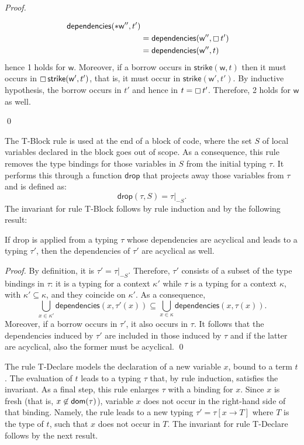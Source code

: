 \begin{proof}
\begin{itemize}
\begin{align*}
      \mathsf{dependencies}(\mathtt{*}\mathsf{w}'',t')\\
      &=\mathsf{dependencies}(\mathsf{w}'',\boxempty\,{t'})\\
      &=\mathsf{dependencies}(\mathsf{w}'',t)
    \end{align*}
    hence 1 holds for $\mathsf{w}$. Moreover, if a borrow occurs in
    $\mathsf{strike}(\mathsf{w},t)$ then it must occurs
    in $\boxempty\,{\mathsf{strike}(\mathsf{w}',t')}$, that is, it must occur in
    $\mathsf{strike}(\mathsf{w}',t')$. By inductive hypothesis, the borrow
    occurs in $t'$ and hence in $t=\boxempty\,{t'}$. Therefore, 2 holds for
    $\mathsf{w}$ as well.
  \end{itemize}
  \qed
\end{proof}

The \textsf{T-Block} rule is used at the end of a block of code, where the set $S$ of local
variables declared in the block goes out of scope. As a consequence, this rule removes
the type bindings for those variables in $S$ from the initial typing $\tau$. It performs this
through a function $\mathsf{drop}$ that projects away those variables from $\tau$ and is defined as:
\[
\mathsf{drop}(\tau,S)=\tau|_{-S}.
\]
The invariant for rule \textsf{T-Block} follows by rule induction and by the following result:
%
\begin{lemma}\label{lem:drop_invariant}
  If \textsf{drop} is applied from a typing $\tau$ whose dependencies
  are acyclical and leads to a typing $\tau'$, then the dependencies
  of $\tau'$ are acyclical as well.
\end{lemma}
\begin{proof}
  By definition, it is $\tau'=\tau|_{-S}$. Therefore, $\tau'$ consists of a subset of the
  type bindings in $\tau$: it is a typing for a context $\kappa'$ while $\tau$ is a
  typing for a context $\kappa$, with $\kappa'\subseteq\kappa$, and they coincide
  on $\kappa'$. As a consequence,
  \[
  \bigcup\limits_{x\in\kappa'}\mathsf{dependencies}(x,\tau'(x))\subseteq
  \bigcup\limits_{x\in\kappa}\mathsf{dependencies}(x,\tau(x)).
  \]
  Moreover, if a borrow occurs in $\tau'$, it also occurs in $\tau$. It follows
  that the dependencies induced by $\tau'$ are included in those induced by $\tau$
  and if the latter are acyclical, also the former must be acyclical.
  \qed
\end{proof}

The rule \textsf{T-Declare} models the declaration of a new variable $x$,
bound to a term $t$. The evaluation of $t$ leads to a typing $\tau$ that, by rule induction,
satisfies the invariant. As a final step, this rule
enlarges $\tau$ with a binding for $x$. Since $x$ is
fresh (that is, $x\not\in\mathsf{dom}(\tau)$),
variable $x$ does not occur in the right-hand side of that binding. Namely, the rule
leads to a new typing $\tau'=\tau[x\to T]$ where $T$ is the type of $t$, such that
$x$ does not occur in $T$. The invariant for rule \textsf{T-Declare} follows by the next result.


